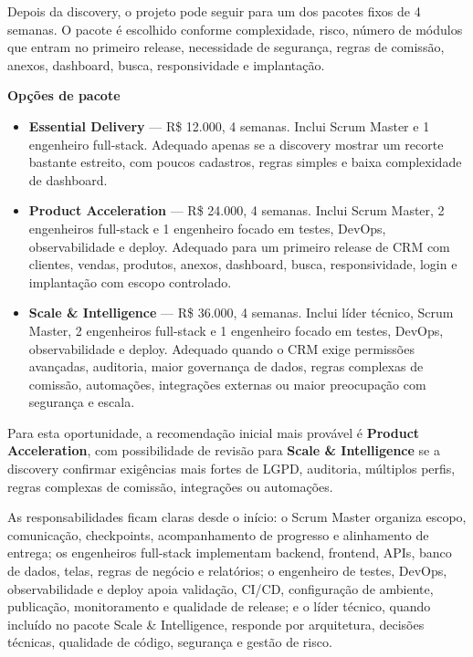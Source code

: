 \documentclass[11pt,a4paper]{article}
\begin{document}
Depois da discovery, o projeto pode seguir para um dos pacotes fixos de 4 semanas. O pacote é escolhido conforme complexidade, risco, número de módulos que entram no primeiro release, necessidade de segurança, regras de comissão, anexos, dashboard, busca, responsividade e implantação.\par

\textbf{Opções de pacote}\par

\begin{itemize}
\item \textbf{Essential Delivery} --- R\$ 12.000, 4 semanas. Inclui Scrum Master e 1 engenheiro full-stack. Adequado apenas se a discovery mostrar um recorte bastante estreito, com poucos cadastros, regras simples e baixa complexidade de dashboard.
\item \textbf{Product Acceleration} --- R\$ 24.000, 4 semanas. Inclui Scrum Master, 2 engenheiros full-stack e 1 engenheiro focado em testes, DevOps, observabilidade e deploy. Adequado para um primeiro release de CRM com clientes, vendas, produtos, anexos, dashboard, busca, responsividade, login e implantação com escopo controlado.
\item \textbf{Scale \& Intelligence} --- R\$ 36.000, 4 semanas. Inclui líder técnico, Scrum Master, 2 engenheiros full-stack e 1 engenheiro focado em testes, DevOps, observabilidade e deploy. Adequado quando o CRM exige permissões avançadas, auditoria, maior governança de dados, regras complexas de comissão, automações, integrações externas ou maior preocupação com segurança e escala.
\end{itemize}

Para esta oportunidade, a recomendação inicial mais provável é \textbf{Product Acceleration}, com possibilidade de revisão para \textbf{Scale \& Intelligence} se a discovery confirmar exigências mais fortes de LGPD, auditoria, múltiplos perfis, regras complexas de comissão, integrações ou automações.\par

As responsabilidades ficam claras desde o início: o Scrum Master organiza escopo, comunicação, checkpoints, acompanhamento de progresso e alinhamento de entrega; os engenheiros full-stack implementam backend, frontend, APIs, banco de dados, telas, regras de negócio e relatórios; o engenheiro de testes, DevOps, observabilidade e deploy apoia validação, CI/CD, configuração de ambiente, publicação, monitoramento e qualidade de release; e o líder técnico, quando incluído no pacote Scale \& Intelligence, responde por arquitetura, decisões técnicas, qualidade de código, segurança e gestão de risco.\par
\end{document}
